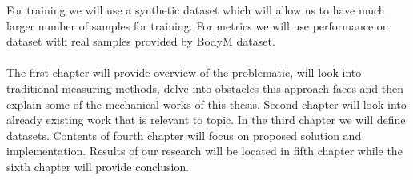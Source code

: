 For training we will use a synthetic dataset which will allow us to have much larger number of samples for training. For metrics we will use performance on dataset with real samples provided by BodyM dataset.\\\\
The first chapter will provide overview of the problematic, will look into traditional measuring methods, delve into obstacles this approach faces and then explain some of the mechanical works of this thesis. Second chapter will look into already existing work that is relevant to topic. In the third chapter we will define datasets. Contents of fourth chapter will focus on proposed solution and implementation. Results of our research will be located in fifth chapter while the sixth chapter will provide conclusion.